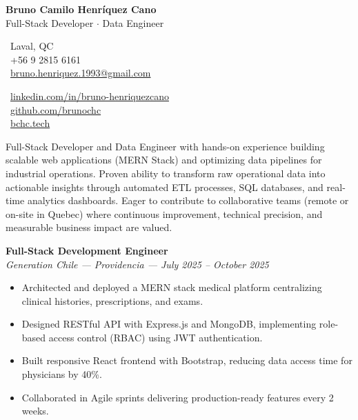 \documentclass[10pt,letterpaper]{article}
\begin{document}
\begin{center}
    {\Huge \textbf{Bruno Camilo Henríquez Cano}} \\[0.2cm]
    {\Large Full-Stack Developer $\cdot$ Data Engineer}
\end{center}

\vspace{0.3cm}

\noindent
\begin{minipage}[t]{0.5\textwidth}
    \faMapMarker\ Laval, QC \\
    \faPhone\ +56 9 2815 6161 \\
    \faEnvelope\ \href{mailto:bruno.henriquez.1993@gmail.com}{bruno.henriquez.1993@gmail.com}
\end{minipage}
\begin{minipage}[t]{0.5\textwidth}
    \faLinkedin\ \href{https://linkedin.com/in/bruno-henriquezcano}{linkedin.com/in/bruno-henriquezcano} \\
    \faGithub\ \href{https://github.com/brunochc}{github.com/brunochc} \\
    \faGlobe\ \href{https://bchc.tech}{bchc.tech}
\end{minipage}

\vspace{0.4cm}


\vspace{0.2cm}

\noindent Full-Stack Developer and Data Engineer with hands-on experience building scalable web applications (MERN Stack) and optimizing data pipelines for industrial operations. Proven ability to transform raw operational data into actionable insights through automated ETL processes, SQL databases, and real-time analytics dashboards. Eager to contribute to collaborative teams (remote or on-site in Quebec) where continuous improvement, technical precision, and measurable business impact are valued.

\vspace{0.4cm}


\vspace{0.3cm}

\noindent \textbf{Full-Stack Development Engineer} \\
\textit{Generation Chile — Providencia — July 2025 – October 2025}
\begin{itemize}
    \item Architected and deployed a MERN stack medical platform centralizing clinical histories, prescriptions, and exams.
    \item Designed RESTful API with Express.js and MongoDB, implementing role-based access control (RBAC) using JWT authentication.
    \item Built responsive React frontend with Bootstrap, reducing data access time for physicians by 40\%.
    \item Collaborated in Agile sprints delivering production-ready features every 2 weeks.
\end{itemize}
\end{document}
